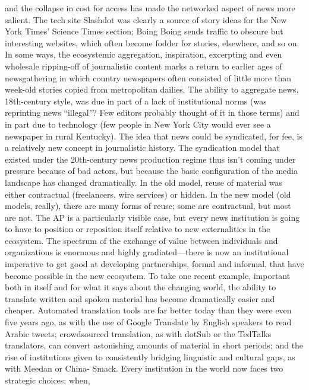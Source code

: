 and the collapse in cost for access has made the networked aspect of news more
salient. The tech site Slashdot was clearly a source of story ideas for the New York
Times’ Science Times section; Boing Boing sends traffic to obscure but interesting
websites, which often become fodder for stories, elsewhere, and so on.
In some ways, the ecosystemic aggregation, inspiration, excerpting and even
wholesale ripping-off of journalistic content marks a return to earlier ages of
newsgathering in which country newspapers often consisted of little more than
week-old stories copied from metropolitan dailies. The ability to aggregate news,
18th-century style, was due in part of a lack of institutional norms (was reprinting
news ``illegal''? Few editors probably thought of it in those terms) and in part
due to technology (few people in New York City would ever see a newspaper
in rural Kentucky). The idea that news could be syndicated, for fee, is a relatively
new concept in journalistic history.
The syndication model that existed under the 20th-century news production
regime thus isn’t coming under pressure because of bad actors, but because the
basic configuration of the media landscape has changed dramatically. In the old
model, reuse of material was either contractual (freelancers, wire services) or hidden.
In the new model (old models, really), there are many forms of reuse; some
are contractual, but most are not. The AP is a particularly visible case, but every
news institution is going to have to position or reposition itself relative to new
externalities in the ecosystem.
The spectrum of the exchange of value between individuals and organizations is
enormous and highly gradiated—there is now an institutional imperative to get
good at developing partnerships, formal and informal, that have become possible
in the new ecosystem. To take one recent example, important both in itself and
for what it says about the changing world, the ability to translate written and
spoken material has become dramatically easier and cheaper.
Automated translation tools are far better today than they were even five years
ago, as with the use of Google Translate by English speakers to read Arabic tweets;
crowdsourced translation, as with dotSub or the TedTalks translators, can convert
astonishing amounts of material in short periods; and the rise of institutions given
to consistently bridging linguistic and cultural gaps, as with Meedan or China‑
Smack. Every institution in the world now faces two strategic choices: when,

